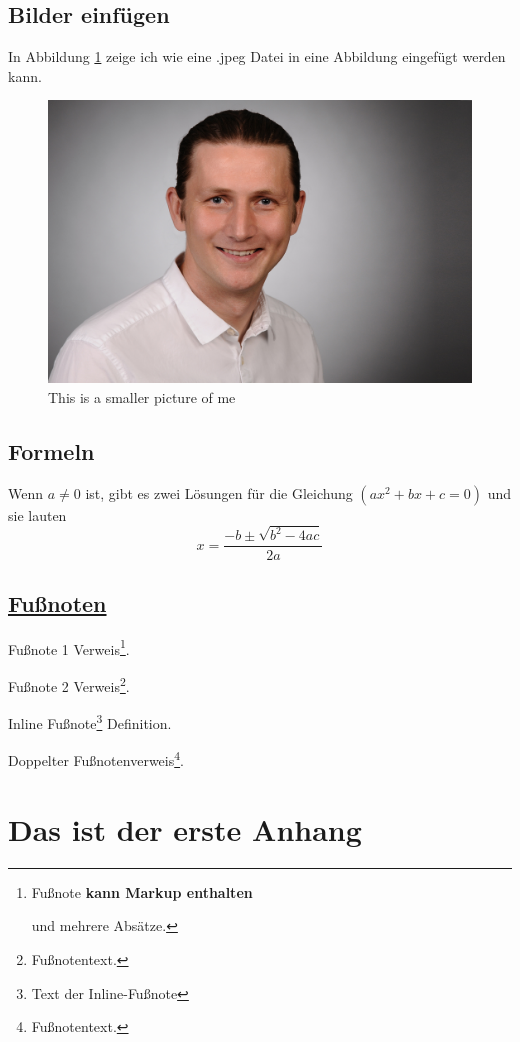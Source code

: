 \documentclass[
  doc,floatsintext]{apa7}
\begin{document}
\hypertarget{bilder-einfuxfcgen}{%
\subsection{Bilder einfügen}\label{bilder-einfuxfcgen}}

In Abbildung \ref{fig:figofme} zeige ich wie eine .jpeg Datei in eine Abbildung eingefügt werden kann.

\begin{figure}

{\centering \includegraphics[width=0.2\linewidth]{temp} 

}

\caption{This is a smaller picture of me}\label{fig:figofme}
\end{figure}

\hypertarget{formeln}{%
\subsection{Formeln}\label{formeln}}

Wenn \(a \ne 0\) ist, gibt es zwei Lösungen für die Gleichung \((ax^2 + bx + c = 0)\) und sie lauten
\[ x = \frac{-b \pm \sqrt{b^2-4ac}}{2a} \]

\hypertarget{fuuxdfnoten}{%
\subsection{\texorpdfstring{\href{https://github.com/markdown-it/markdown-it-footnote}{Fußnoten}}{Fußnoten}}\label{fuuxdfnoten}}

Fußnote 1 Verweis\footnote{Fußnote \textbf{kann Markup enthalten}

  und mehrere Absätze.}.

Fußnote 2 Verweis\footnote{Fußnotentext.}.

Inline Fußnote\footnote{Text der Inline-Fußnote} Definition.

Doppelter Fußnotenverweis\footnote{Fußnotentext.}.

\printbibliography

\newpage

\hypertarget{appendix-appendix}{%
\appendix}


\hypertarget{das-ist-der-erste-anhang}{%
\section{Das ist der erste Anhang}\label{das-ist-der-erste-anhang}}
\end{document}
